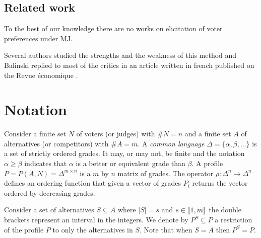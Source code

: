 \documentclass[version=3.21, pagesize, twoside=off, bibliography=totoc, DIV=calc, fontsize=12pt, a4paper]{scrartcl}
\begin{document}
\subsection{Related work}

To the best of our knowledge there are no works on elicitation of voter preferences under \acs{MJ}.

Several authors studied the strengths and the weakness of this method \citep{Felsenthal2008,Laslier2018} and Balinski replied to most of the critics in an article written in french published on the Revue économique \citep{Balinski2019}.




\section{Notation}
\label{sec:complete}
Consider a finite set $N$ of voters (or judges) with $\#N=n$ and a finite set $A$ of alternatives (or competitors) with $\#A=m$. 
A \textit{common language} $\Delta = \{ \alpha, \beta, \dots \}$ is a set of strictly ordered grades. It may, or may not, be finite and the notation $\alpha \geq \beta$ indicates that $\alpha$ is a better or equivalent grade than $\beta$. A profile $P = P(A,N) = \Delta^{m \times n}$ is a $m$ by $n$ matrix of grades. The operator $\rho: \Delta^{n} \rightarrow \Delta^n$ defines an ordering function that given a vector of grades $P_i$ returns the vector ordered by decreasing grades.

Consider a set of alternatives $S\subseteq A$ where $|S|=s$ and $s \in \llbracket1,m\rrbracket$ \textemdash the double brackets represent an interval in the integers. We denote by $P^S \subseteq P$ a restriction of the profile $P$ to only the alternatives in $S$. Note that when $S=A$ then $P^S=P$.
\end{document}
